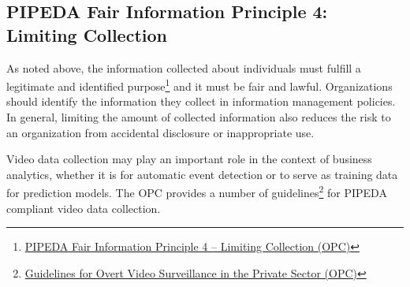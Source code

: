 \subsection*{PIPEDA Fair Information Principle 4: Limiting Collection}

As noted above, the information collected about individuals must fulfill a legitimate and identified purpose\footnote{\href{https://www.priv.gc.ca/en/privacy-topics/privacy-laws-in-canada/the-personal-information-protection-and-electronic-documents-act-pipeda/p_principle/principles/p_collection/}{PIPEDA Fair Information Principle 4 -- Limiting Collection (OPC)}} and it must be fair and lawful. Organizations should identify the information they collect in information management policies. In general, limiting the amount of collected information also reduces the risk to an organization from accidental disclosure or inappropriate use. 

Video data collection may play an important role in the context of business analytics, whether it is for automatic event detection or to serve as training data for prediction models. The OPC provides a number of guidelines\footnote{\href{https://www.priv.gc.ca/en/privacy-topics/surveillance/video-surveillance-by-businesses/gl_vs_080306/}{Guidelines for Overt Video Surveillance in the Private Sector (OPC)}} for PIPEDA compliant video data collection. 

